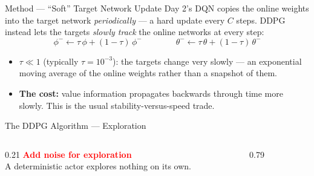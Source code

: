 \begin{frame}{Method --- ``Soft'' Target Network Update}
\vspace{0.5em}
Day 2's DQN copies the online weights into the target network \emph{periodically} --- a hard update every $C$ steps. DDPG instead lets the targets \emph{slowly track} the online networks at every step:
\[
\phi^{-} \leftarrow \tau\, \phi + (1-\tau)\, \phi^{-}
\qquad\qquad
\theta^{-} \leftarrow \tau\, \theta + (1-\tau)\, \theta^{-}
\]
\vspace{0.2em}
\begin{itemize}
    \item $\tau \ll 1$ (typically $\tau = 10^{-3}$): the targets change very slowly --- an exponential moving average of the online weights rather than a snapshot of them.
    \pause
    \item \textbf{The cost:} value information propagates backwards through time more slowly. This is the usual stability-versus-speed trade.
\end{itemize}
\end{frame}

\begin{frame}{The DDPG Algorithm --- Exploration}
\begin{columns}[T]
\begin{column}{0.21\textwidth}
\vspace{5.7em}
\footnotesize
\textbf{\textcolor{red}{Add noise for exploration}}\\[0.4em]
{\scriptsize A deterministic actor explores nothing on its own.}
\end{column}
\begin{column}{0.79\textwidth}
\end{column}
\end{columns}
\end{frame}


